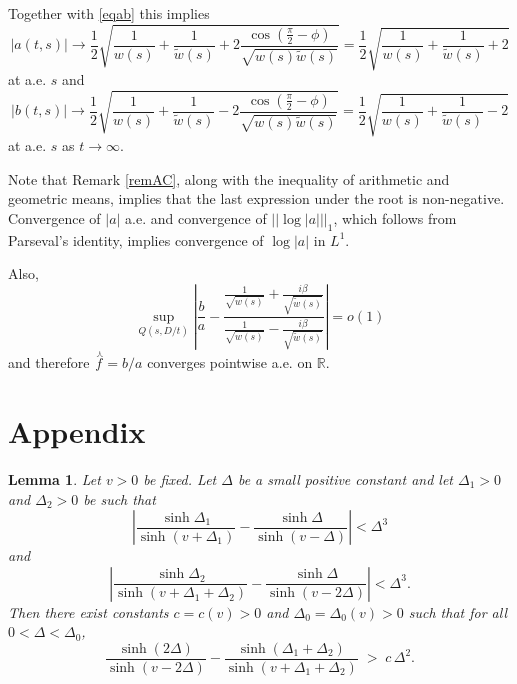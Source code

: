 \documentclass[11pt,twoside,reqno]{amsart}
\def\ti{\tilde}
\def\to{\rightarrow}
\def \nlhat {\overset{\ \curlywedge}}
\def\R{{\mathbb R}}
\def\b{\beta}
\theoremstyle{plain}
\newtheorem{lemma}{Lemma}
\numberwithin{equation}{section}
\begin{document}
Together with \eqref{eqab} this implies
$$|a(t,s)|\to\frac 12\sqrt{\frac 1{w(s)}+\frac 1{\ti w(s)}+2\frac{\cos\left(\frac \pi 2 -\phi\right)}{\sqrt{w(s)\ti w(s)}}}=\frac 12\sqrt{\frac 1{w(s)}+\frac 1{\ti w(s)}+2}$$
at a.e. $s$ and
$$|b(t,s)|\to\frac 12\sqrt{\frac 1{w(s)}+\frac 1{\ti w(s)}-2\frac{\cos\left(\frac \pi 2 -\phi\right)}{\sqrt{w(s)\ti w(s)}}}=\frac 12\sqrt{\frac 1{w(s)}+\frac 1{\ti w(s)}-2}$$
at a.e. $s$ as $t\to\infty$. 

Note that Remark \ref{remAC}, along with the inequality of arithmetic and geometric means, implies that the last expression under the root is non-negative. 
Convergence of $|a|$ a.e. and convergence of $||\log|a| ||_1$, which follows from Parseval's identity, implies
convergence of $\log|a|$ in $L^1$.



Also,
$$\sup_{Q(s,D/t)}\left|\frac ba - \frac{\frac 1{\sqrt{w(s)}}+\frac {i\b}{\sqrt{\ti w(s)}}}{\frac 1{\sqrt{w(s)}}-\frac {i\b}{\sqrt{\ti w(s)}} }   \right|=
o(1)$$
and therefore $\nlhat f=b/a$ converges pointwise a.e. on $\R$.


\section{Appendix}
\begin{lemma}\label{lemAppendix}
	Let $v>0$ be fixed. Let $\Delta$ be  a small positive constant and let 
	$\Delta_1>0$ and $\Delta_2>0$ be such that
	\[
	\left|\frac{\sinh \Delta_1}{\sinh(v+\Delta_1)}
	-\frac{\sinh \Delta}{\sinh(v-\Delta)}\right| <\Delta^3
	\]and \[
	\left|\frac{\sinh \Delta_2}{\sinh(v+\Delta_1+\Delta_2)}
	-\frac{\sinh \Delta}{\sinh(v-2\Delta)}\right| <\Delta^3.
	\]
	Then there exist constants $c=c(v)>0$ and $\Delta_0=\Delta_0(v)>0$ such that
	for all $0<\Delta<\Delta_0$,
	\[
	\frac{\sinh(2\Delta)}{\sinh(v-2\Delta)}
	-
	\frac{\sinh(\Delta_1+\Delta_2)}{\sinh(v+\Delta_1+\Delta_2)}
	\;>\;
	c\,\Delta^2 .
	\]
\end{lemma}
\end{document}
